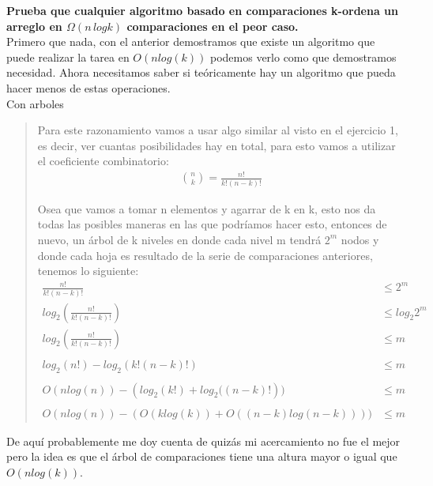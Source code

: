 \textbf{Prueba que cualquier algoritmo basado en comparaciones k-ordena un arreglo en $\Omega (n \, log k)$ comparaciones en el peor caso.}\\

Primero que nada, con el anterior demostramos que existe un algoritmo que puede realizar la tarea en $O(n log(k))$ podemos verlo como que demostramos necesidad. Ahora necesitamos saber si teóricamente hay un algoritmo que pueda hacer menos de estas operaciones.\\

\textcolor{bibi}{Con arboles}
\begin{quote}
    Para este razonamiento vamos a usar algo similar al visto en el ejercicio 1, es decir, ver cuantas posibilidades hay en total, para esto vamos a utilizar el coeficiente combinatorio:
    \begin{align*}
        \binom{n}{k} = \frac{n!}{k!(n-k)!}
    \end{align*}

    Osea que vamos a tomar n elementos y agarrar de k en k, esto nos da todas las posibles maneras en las que podríamos hacer esto, entonces de nuevo, un árbol de k niveles en donde cada nivel m tendrá $2^m$ nodos y donde cada hoja es resultado de la serie de comparaciones anteriores, tenemos lo siguiente:
    \begin{align*}
        \frac{n!}{k!(n-k)!} &\leq 2^m \\
        log_2{\left(\frac{n!}{k!(n-k)!}\right)} &\leq log_2{2^m} \\
        log_2{\left(\frac{n!}{k!(n-k)!}\right)} &\leq m \\\\
        log_2{(n!)} - log_2{(k!(n-k)!)} &\leq m \\\\
        O(nlog(n)) - (log_2{(k!)} + log_2{((n-k)!} ))&\leq m \\\\
        O(nlog(n)) - (O(k log(k)) + O((n-k) log (n-k))) )&\leq m 
    \end{align*}
\end{quote}

De aquí probablemente me doy cuenta de quizás mi acercamiento no fue el mejor pero la idea es que el árbol de comparaciones tiene una altura mayor o igual que $O(nlog(k))$.\\